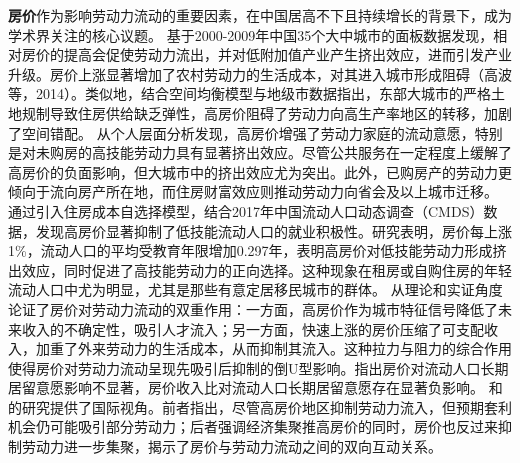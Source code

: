 \documentclass[a4paper, zihao=-4, fontset = mac, oneside]{ctexbook} %
\begin{document}
\textbf{房价}作为影响劳动力流动的重要因素，在中国居高不下且持续增长的背景下，成为学术界关注的核心议题。
\textcite{GaoBoQuYuFangJieChaiYiLaoDongLiLiuDongYuChanYeShengJi2012}基于2000-2009年中国35个大中城市的面板数据发现，相对房价的提高会促使劳动力流出，并对低附加值产业产生挤出效应，进而引发产业升级。房价上涨显著增加了农村劳动力的生活成本，对其进入城市形成阻碍（高波等，2014）。类似地，\textcite{WangLiLiTuDiGongGeiFangJieYuLaoDongLiKongJianPeiZhiXiaoLu2023}结合空间均衡模型与地级市数据指出，东部大城市的严格土地规制导致住房供给缺乏弹性，高房价阻碍了劳动力向高生产率地区的转移，加剧了空间错配。
\textcite{ZhouYingGangGaoFangJieJiChuLiaoShuiJiYuZhongGuoLiuDongRenKouDeWeiGuanShiJiao2019}从个人层面分析发现，高房价增强了劳动力家庭的流动意愿，特别是对未购房的高技能劳动力具有显著挤出效应。尽管公共服务在一定程度上缓解了高房价的负面影响，但大城市中的挤出效应尤为突出。此外，已购房产的劳动力更倾向于流向房产所在地，而住房财富效应则推动劳动力向省会及以上城市迁移。
\textcite{zhouHousingPricesMigration2022}通过引入住房成本自选择模型，结合2017年中国流动人口动态调查（CMDS）数据，发现高房价显著抑制了低技能流动人口的就业积极性。研究表明，房价每上涨1\%，流动人口的平均受教育年限增加0.297年，表明高房价对低技能劳动力形成挤出效应，同时促进了高技能劳动力的正向选择。这种现象在租房或自购住房的年轻流动人口中尤为明显，尤其是那些有意定居移民城市的群体。
\textcite{ZhangLiFangJieRuHeYingXiangLaoDongLiLiuDong2017}从理论和实证角度论证了房价对劳动力流动的双重作用：一方面，高房价作为城市特征信号降低了未来收入的不确定性，吸引人才流入；另一方面，快速上涨的房价压缩了可支配收入，加重了外来劳动力的生活成本，从而抑制其流入。这种拉力与阻力的综合作用使得房价对劳动力流动呈现先吸引后抑制的倒U型影响。\textcite{LiHuiFangJieFangJieShouRuBiYuLiuDongRenKouChangQiJuLiuYiYuanLaiZiLiuDongRenKouDeWeiGuanZhengJu2019}指出房价对流动人口长期居留意愿影响不显著，房价收入比对流动人口长期居留意愿存在显著负影响。
\textcite{ballHousingSupplyPrice2010}和\textcite{helpmanSizeRegions1998}的研究提供了国际视角。前者指出，尽管高房价地区抑制劳动力流入，但预期套利机会仍可能吸引部分劳动力；后者强调经济集聚推高房价的同时，房价也反过来抑制劳动力进一步集聚，揭示了房价与劳动力流动之间的双向互动关系。
\end{document}
